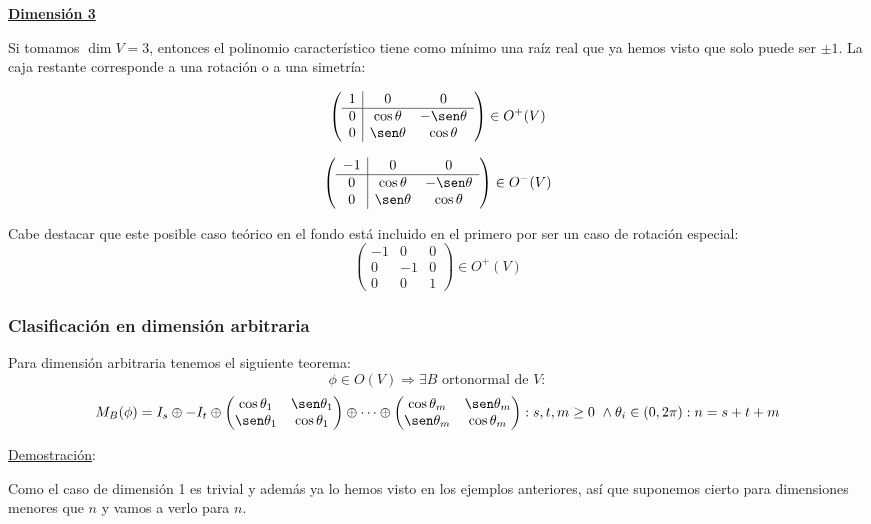 \documentclass[10pt,a4paper,openright]{book}
\theoremstyle{break}
\begin{document}
\underline{\textbf{Dimensión 3}}

Si tomamos $\dim V = 3$, entonces el polinomio característico tiene como mínimo una raíz real que ya hemos visto que solo puede ser $\pm 1$. La caja restante corresponde a una rotación o a una simetría:

$$\left(\begin{array}{c|cc}
1  & 0 & 0 \\
\hline
0  & \cos\theta & -\sen\theta \\
0 & \sen\theta & \cos\theta
\end{array}
\right) \in O^+ (V)$$

$$\left(\begin{array}{c|cc}
-1  & 0 & 0 \\
\hline
0  & \cos\theta & -\sen\theta \\
0 & \sen\theta & \cos\theta
\end{array}
\right)  \in O^- (V)$$

Cabe destacar que este posible caso teórico en el fondo está incluido en el primero por ser un caso de rotación especial:
$$\left(\begin{array}{c|cc}
-1  & 0 & 0 \\
\hline
0  & -1 & 0 \\
0 & 0 & 1 
\end{array}
\right)  \in O^+ (V)$$

\subsubsection*{Clasificación en dimensión arbitraria}

Para dimensión arbitraria tenemos el siguiente teorema:
$$\phi\in O(V)\Rightarrow \exists B \mbox{ ortonormal de }V: $$
$$M_B(\phi) = I_s \oplus -I_t \oplus \begin{pmatrix} \cos \theta_1 & \sen \theta_1 \\ \sen \theta_1 & \cos \theta_1\end{pmatrix} \oplus \cdots \oplus \begin{pmatrix} \cos \theta_m & \sen \theta_m \\ \sen \theta_m & \cos \theta_m\end{pmatrix}: s,t,m \geq 0 \ \wedge \theta_i \in (0,2\pi): n = s+t+m$$

\underline{Demostración}:

Como el caso de dimensión 1 es trivial y además ya lo hemos visto en los ejemplos anteriores, así que suponemos cierto para dimensiones menores que $n$ y vamos a verlo para $n$.
\end{document}
